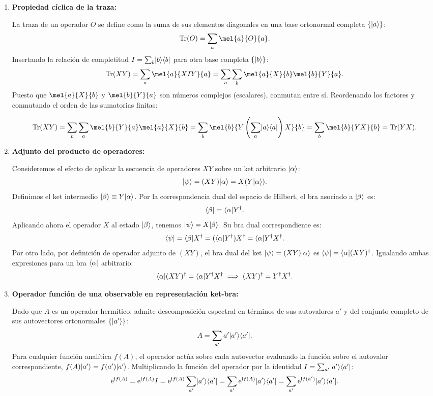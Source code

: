 \begin{resolucion}
\begin{enumerate}
  \item \textbf{Propiedad cíclica de la traza:}

  La traza de un operador $O$ se define como la suma de sus elementos diagonales en una base ortonormal completa $\{\lvert a\rangle\}$:
  \[
  \Tr(O) = \sum_a \mel{a}{O}{a}.
  \]
  Insertando la relación de completitud $I = \sum_b \lvert b\rangle\langle b\rvert$ para otra base completa $\{\lvert b\rangle\}$:
  \[
  \Tr(XY) = \sum_a \mel{a}{X I Y}{a} = \sum_a \sum_b \mel{a}{X}{b} \mel{b}{Y}{a}.
  \]
  Puesto que $\mel{a}{X}{b}$ y $\mel{b}{Y}{a}$ son números complejos (escalares), conmutan entre sí. Reordenando los factores y conmutando el orden de las sumatorias finitas:
  
  \[
  \Tr(XY) = \sum_b \sum_a \mel{b}{Y}{a} \mel{a}{X}{b} = \sum_b \mel{b}{Y \left( \sum_a \ket{a}\bra{a} \right) X}{b} = \sum_b \mel{b}{YX}{b} = \Tr(YX).
  \]

  \item \textbf{Adjunto del producto de operadores:}

  Consideremos el efecto de aplicar la secuencia de operadores $XY$ sobre un ket arbitrario $\lvert\alpha\rangle$:
  \[
  \lvert\psi\rangle = (XY)\lvert\alpha\rangle = X(Y\lvert\alpha\rangle).
  \]
  Definimos el ket intermedio $\lvert\beta\rangle \equiv Y\lvert\alpha\rangle$. Por la correspondencia dual del espacio de Hilbert, el bra asociado a $\lvert\beta\rangle$ es:
  \[
  \langle\beta\rvert = \langle\alpha\rvert Y^\dagger.
  \]
  Aplicando ahora el operador $X$ al estado $\lvert\beta\rangle$, tenemos $\lvert\psi\rangle = X\lvert\beta\rangle$. Su bra dual correspondiente es:
  \[
  \langle\psi\rvert = \langle\beta\rvert X^\dagger = (\langle\alpha\rvert Y^\dagger) X^\dagger = \langle\alpha\rvert Y^\dagger X^\dagger.
  \]
  Por otro lado, por definición de operador adjunto de $(XY)$, el bra dual del ket $\lvert\psi\rangle = (XY)\lvert\alpha\rangle$ es $\langle\psi\rvert = \langle\alpha\rvert (XY)^\dagger$. Igualando ambas expresiones para un bra $\langle\alpha\rvert$ arbitrario:
  \[
  \langle\alpha\rvert (XY)^\dagger = \langle\alpha\rvert Y^\dagger X^\dagger \implies (XY)^\dagger = Y^\dagger X^\dagger.
  \]

  \item \textbf{Operador función de una observable en representación ket-bra:}

  Dado que $A$ es un operador hermítico, admite descomposición espectral en términos de sus autovalores $a'$ y del conjunto completo de sus autovectores ortonormales $\{\lvert a'\rangle\}$:
  \[
  A = \sum_{a'} a' \lvert a'\rangle\langle a'\rvert.
  \]
  Para cualquier función analítica $f(A)$, el operador actúa sobre cada autovector evaluando la función sobre el autovalor correspondiente, $f(A)\lvert a'\rangle = f(a')\lvert a'\rangle$. Multiplicando la función del operador por la identidad $I = \sum_{a'} \lvert a'\rangle\langle a'\rvert$:
  \[
  \mathrm{e}^{\mathrm{i} f(A)} = \mathrm{e}^{\mathrm{i} f(A)} I = \mathrm{e}^{\mathrm{i} f(A)} \sum_{a'} \lvert a'\rangle\langle a'\rvert = \sum_{a'} \mathrm{e}^{\mathrm{i} f(A)} \lvert a'\rangle\langle a'\rvert = \sum_{a'} \mathrm{e}^{\mathrm{i} f(a')} \lvert a'\rangle\langle a'\rvert.
  \]


\end{enumerate}
\end{resolucion}
